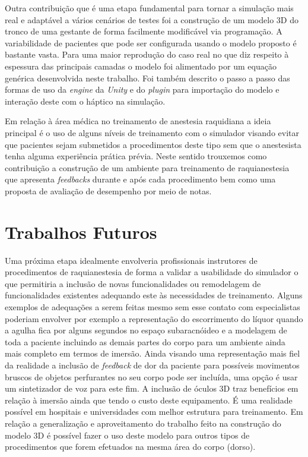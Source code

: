 Outra contribuição que é uma etapa fundamental para tornar a simulação mais real e adaptável a vários cenários de testes foi a construção de um modelo 3D do tronco de uma gestante de forma facilmente modificável via programação. A variabilidade de pacientes que pode ser configurada usando o modelo proposto é bastante vasta. Para uma maior reprodução do caso real no que diz respeito à espessura das principais camadas o modelo foi alimentado por um equação genérica desenvolvida neste trabalho. Foi também descrito o passo a passo das formas de uso da \textit{engine} da \textit{Unity} e do \textit{plugin} para importação do modelo e interação deste com o háptico na simulação. 

Em relação à área médica no treinamento de anestesia raquidiana a ideia principal é o uso de alguns níveis de treinamento com o simulador visando evitar que pacientes sejam submetidos a procedimentos deste tipo sem que o anestesista tenha alguma experiência prática prévia. Neste sentido trouxemos como contribuição a construção de um ambiente para treinamento de raquianestesia que apresenta \textit{feedbacks} durante e após cada procedimento bem como uma proposta de avaliação de desempenho por meio de notas. 

\section{Trabalhos Futuros}
\label{sec:trabFuturo}

Uma próxima etapa idealmente envolveria profissionais instrutores de procedimentos de raquianestesia de forma a validar a usabilidade do simulador o que permitiria a inclusão de novas funcionalidades ou remodelagem de funcionalidades existentes adequando este às necessidades de treinamento. Alguns exemplos de adequações a serem feitas mesmo sem esse contato com especialistas poderiam envolver por exemplo a representação do escorrimento do líquor quando a agulha fica por alguns segundos no espaço subaracnóideo e a modelagem de toda a paciente incluindo as demais partes do corpo para um ambiente ainda mais completo em termos de imersão. Ainda visando uma representação mais fiel da realidade a inclusão de \textit{feedback} de dor da paciente para possíveis movimentos bruscos de objetos perfurantes no seu corpo pode ser incluída, uma opção é usar um sintetizador de voz para este fim. A inclusão de óculos 3D traz benefícios em relação à imersão ainda que tendo o custo deste equipamento. É uma realidade possível em hospitais e universidades com melhor estrutura para treinamento.
Em relação a generalização e aproveitamento do trabalho feito na construção do modelo 3D é possível fazer o uso deste modelo para outros tipos de procedimentos que forem efetuados na mesma área do corpo (dorso). 

